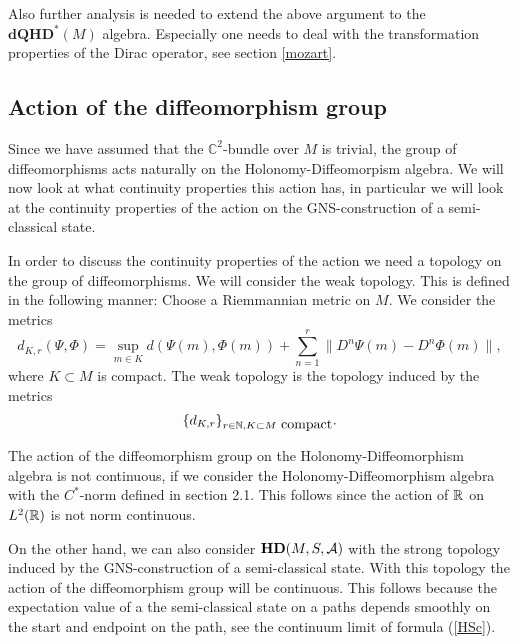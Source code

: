 \documentclass[12pt]{article}
\def\ca{{\cal A}}
\newcommand{\bbR}{{\Bbb R}}
\begin{document}
Also further analysis is needed to extend the above argument to the $\mathbf{dQHD}^*(M)$ algebra. Especially one needs to deal with the transformation properties of the Dirac operator, see section \ref{mozart}.



























\subsection{Action of the diffeomorphism group}  
\label{actdiff}

Since we have assumed that the $\mathbb{C}^2$-bundle over $M$ is trivial, the group of diffeomorphisms acts naturally on the Holonomy-Diffeomorpism algebra. We will now look at what continuity properties this action has, in particular we will look at the continuity properties of the action on the GNS-construction of a semi-classical state.  

In order to discuss the continuity properties of the action we need a topology on the group of diffeomorphisms. We will consider the weak topology. This is defined in the following manner: Choose a Riemmannian metric on $M$. We consider the metrics
$$d_{K,r}(\Psi,\Phi)= \sup_{m\in K} d(\Psi (m),\Phi (m))+\sum_{n=1}^r \|D^n\Psi(m)-D^n\Phi (m) \|,$$ 
where $ K\subset M $ is  compact.
The weak topology is the topology induced by the metrics 
$$\{ d_{K,r}\}_{r\in \mathbb{N},K\subset M \hbox{ compact} }.$$

The action of the diffeomorphism group on the Holonomy-Diffeomorphism algebra is not continuous, if we consider the Holonomy-Diffeomorphism algebra with the $C^*$-norm defined in section 2.1. This follows since the action of $\bbR$ on $L^2(\bbR)$ is not norm continuous.

On the other hand, we can also consider  $\mathbf{HD}(M,S,\ca )$ with the strong topology induced by the GNS-construction of a semi-classical state. With this topology the action of the diffeomorphism group will be continuous. This follows because the expectation value of a the semi-classical state on a paths depends smoothly on the start and endpoint on the path, see the continuum limit of formula (\ref{HSc}).
\end{document}
